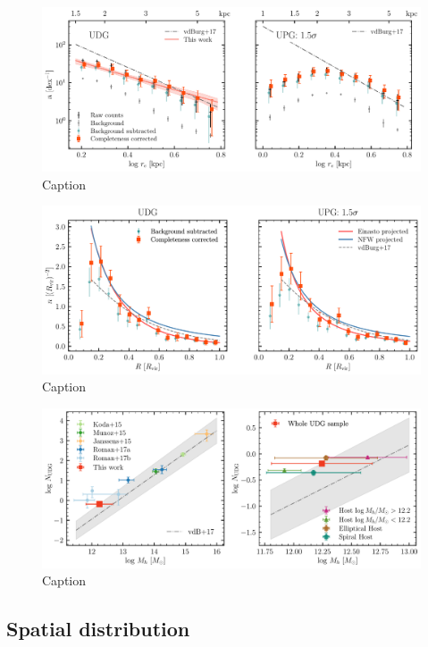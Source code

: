 \documentclass[twocolumn,astrosymb,twocolappendix]{aastex631}
\begin{document}
\begin{CJK*}{UTF8}{gbsn}
\begin{figure}
	\vbox{ 
		\centering
		\includegraphics[width=1\linewidth]{size_distribution.pdf}
	}
    \caption{Caption}
    \label{fig:size_distribution}
\end{figure}


\begin{figure}
	\vbox{ 
		\centering
		\includegraphics[width=1\linewidth]{radial_distribution.pdf}
	}
    \caption{Caption}
    \label{fig:radial_distribution}
\end{figure}


\begin{figure}
	\vbox{ 
		\centering
		\includegraphics[width=1\linewidth]{N_UDG_host_mass.pdf}
	}
    \caption{Caption}
    \label{fig:n_udg}
\end{figure}

\subsection{Spatial distribution}


\end{CJK*}
\end{document}
